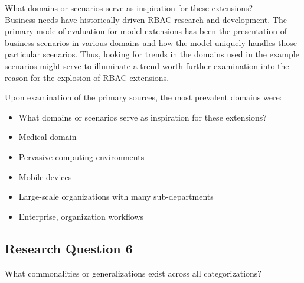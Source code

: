 What domains or scenarios serve as inspiration for these extensions? \\

Business needs have historically driven RBAC research and development.  The primary mode of evaluation for
model extensions has been the presentation of business scenarios in various domains and how the model
uniquely handles those particular scenarios.  Thus, looking for trends in the domains used in the example
scenarios might serve to illuminate a trend worth further examination into the reason for the explosion of
RBAC extensions.

Upon examination of the primary sources, the most prevalent domains were:

\begin{itemize}
\item What domains or scenarios serve as inspiration for these extensions?
\item Medical domain
\item Pervasive computing environments
\item Mobile devices
\item Large-scale organizations with many sub-departments
\item Enterprise, organization workflows
\end{itemize}

\subsection{Research Question 6}

What commonalities or generalizations exist across all categorizations? \\
